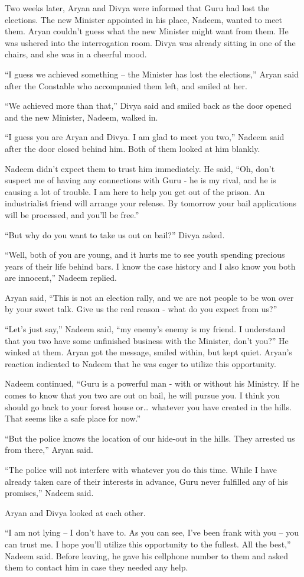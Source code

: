 Two weeks later, Aryan and Divya were informed that Guru had lost the elections.
The new Minister appointed in his place, Nadeem, wanted to meet them. Aryan
couldn't guess what the new Minister might want from them. He was ushered into
the interrogation room. Divya was already sitting in one of the chairs, and she
was in a cheerful mood.

“I guess we achieved something – the Minister has lost the elections,” Aryan
said after the Constable who accompanied them left, and smiled at her.

“We achieved more than that,” Divya said and smiled back as the door opened and
the new Minister, Nadeem, walked in.

“I guess you are Aryan and Divya. I am glad to meet you two,” Nadeem said after
the door closed behind him. Both of them looked at him blankly.

Nadeem didn't expect them to trust him immediately. He said, “Oh, don't suspect
me of having any connections with Guru - he is my rival, and he is causing a lot of
trouble. I am here to help you get out of the prison. An industrialist friend
will arrange your release. By tomorrow your bail applications will be processed,
and you'll be free.”

“But why do you want to take us out on bail?” Divya asked.

“Well, both of you are young, and it hurts me to see youth spending precious
years of their life behind bars. I know the case history and I also know you
both are innocent,” Nadeem replied.

Aryan said, “This is not an election rally, and we are not people to be won over
by your sweet talk. Give us the real reason - what do you expect from us?”

“Let's just say,” Nadeem said, “my enemy's enemy is my friend. I understand that
you two have some unfinished business with the Minister, don't you?” He winked
at them. Aryan got the message, smiled within, but kept quiet. Aryan's reaction
indicated to Nadeem that he was eager to utilize this opportunity.

Nadeem continued, “Guru is a powerful man - with or without his Ministry. If he
comes to know that you two are out on bail, he will pursue you. I think you
should go back to your forest house or… whatever you have created in the
hills. That seems like a safe place for now.”

“But the police knows the location of our hide-out in the hills. They arrested
us from there,” Aryan said.

“The police will not interfere with whatever you do this time. While I have
already taken care of their interests in advance, Guru never fulfilled any of
his promises,” Nadeem said.

Aryan and Divya looked at each other.

“I am not lying – I don't have to. As you can see, I've been frank with you –
you can trust me. I hope you'll utilize this opportunity to the fullest. All the
best,” Nadeem said. Before leaving, he gave his cellphone number to them and
asked them to contact him in case they needed any help.